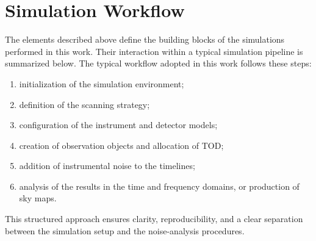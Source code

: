 \section{Simulation Workflow}
The elements described above define the building blocks of the simulations performed in this work. Their interaction within a typical simulation pipeline is summarized below.
The typical workflow adopted in this work follows these steps:
\begin{enumerate}
    \item initialization of the simulation environment;
    \item definition of the scanning strategy;
    \item configuration of the instrument and detector models;
    \item creation of observation objects and allocation of TOD;
    \item addition of instrumental noise to the timelines;
    \item analysis of the results in the time and frequency domains, or production of sky maps.
\end{enumerate}

This structured approach ensures clarity, reproducibility, and a clear separation between the simulation setup and the noise-analysis procedures.


